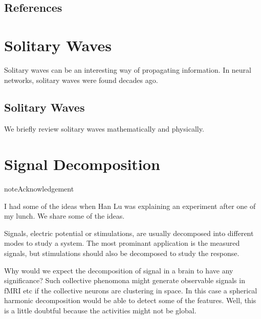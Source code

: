 \documentclass[letterpaper,10pt,english]{sphinxmanual}
\begin{document}
\subsection{References}
\label{\detokenize{neuroscience/functional-connectivity:references}}

\section{Solitary Waves}
\label{\detokenize{neuroscience/solitary-waves::doc}}\label{\detokenize{neuroscience/solitary-waves:solitary-waves}}
Solitary waves can be an interesting way of propagating information. In neural networks, solitary waves were found decades ago.


\subsection{Solitary Waves}
\label{\detokenize{neuroscience/solitary-waves:id1}}
We briefly review solitary waves mathematically and physically.


\section{Signal Decomposition}
\label{\detokenize{neuroscience/signal-decomposition:signal-decomposition}}\label{\detokenize{neuroscience/signal-decomposition::doc}}
\begin{sphinxadmonition}{note}{Acknowledgement}

I had some of the ideas when Han Lu was explaining an experiment after one of my lunch. We share some of the ideas.
\end{sphinxadmonition}

Signals, electric potential or stimulations, are usually decomposed into different modes to study a system. The most prominant application is the measured signals, but stimulations should also be decomposed to study the response.

Why would we expect the decomposition of signal in a brain to have any significance?  Such collective phenomona might generate observable signals in fMRI etc if the collective neurons are clustering in space. In this case a spherical harmonic decomposition would be able to detect some of the features. Well, this is a little doubtful because the activities might not be global.
\end{document}
